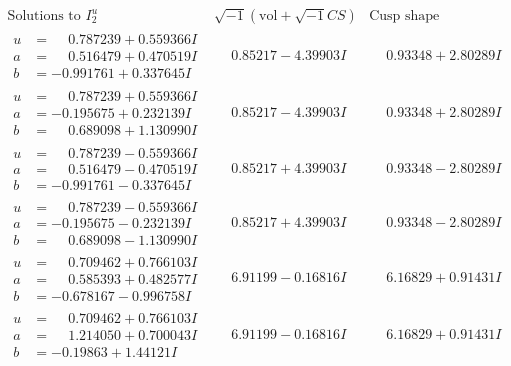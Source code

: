 \documentclass[1p]{elsarticle_modified}
\theoremstyle{definition}
\newcommand{\I}{\sqrt{-1}}
\begin{document}
$$\begin{array}{c|c|c}  
\text{Solutions to }I^u_{2}& \I (\text{vol} + \sqrt{-1}CS) & \text{Cusp shape}\\
 \hline 
\begin{aligned}
u &= \phantom{-}0.787239 + 0.559366 I \\
a &= \phantom{-}0.516479 + 0.470519 I \\
b &= -0.991761 + 0.337645 I\end{aligned}
 & \phantom{-}0.85217 - 4.39903 I & \phantom{-}0.93348 + 2.80289 I \\ \hline\begin{aligned}
u &= \phantom{-}0.787239 + 0.559366 I \\
a &= -0.195675 + 0.232139 I \\
b &= \phantom{-}0.689098 + 1.130990 I\end{aligned}
 & \phantom{-}0.85217 - 4.39903 I & \phantom{-}0.93348 + 2.80289 I \\ \hline\begin{aligned}
u &= \phantom{-}0.787239 - 0.559366 I \\
a &= \phantom{-}0.516479 - 0.470519 I \\
b &= -0.991761 - 0.337645 I\end{aligned}
 & \phantom{-}0.85217 + 4.39903 I & \phantom{-}0.93348 - 2.80289 I \\ \hline\begin{aligned}
u &= \phantom{-}0.787239 - 0.559366 I \\
a &= -0.195675 - 0.232139 I \\
b &= \phantom{-}0.689098 - 1.130990 I\end{aligned}
 & \phantom{-}0.85217 + 4.39903 I & \phantom{-}0.93348 - 2.80289 I \\ \hline\begin{aligned}
u &= \phantom{-}0.709462 + 0.766103 I \\
a &= \phantom{-}0.585393 + 0.482577 I \\
b &= -0.678167 - 0.996758 I\end{aligned}
 & \phantom{-}6.91199 - 0.16816 I & \phantom{-}6.16829 + 0.91431 I \\ \hline\begin{aligned}
u &= \phantom{-}0.709462 + 0.766103 I \\
a &= \phantom{-}1.214050 + 0.700043 I \\
b &= -0.19863 + 1.44121 I\end{aligned}
 & \phantom{-}6.91199 - 0.16816 I & \phantom{-}6.16829 + 0.91431 I \\ \hline\begin{aligned}

\end{aligned}
\end{array}$$
\end{document}
